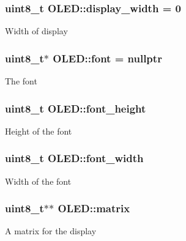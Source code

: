 \subsubsection[{\texorpdfstring{display\+\_\+width}{display_width}}]{\setlength{\rightskip}{0pt plus 5cm}uint8\+\_\+t O\+L\+E\+D\+::display\+\_\+width = 0\hspace{0.3cm}{\ttfamily [protected]}}\hypertarget{class_o_l_e_d_a2e9305cb3341509bb62d61f33cae76fd}{}\label{class_o_l_e_d_a2e9305cb3341509bb62d61f33cae76fd}
Width of display 
\subsubsection[{\texorpdfstring{font}{font}}]{\setlength{\rightskip}{0pt plus 5cm}uint8\+\_\+t$\ast$ O\+L\+E\+D\+::font = nullptr\hspace{0.3cm}{\ttfamily [protected]}}\hypertarget{class_o_l_e_d_a29ab86a4a73f4d343bf1810927f0911d}{}\label{class_o_l_e_d_a29ab86a4a73f4d343bf1810927f0911d}
The font 
\subsubsection[{\texorpdfstring{font\+\_\+height}{font_height}}]{\setlength{\rightskip}{0pt plus 5cm}uint8\+\_\+t O\+L\+E\+D\+::font\+\_\+height\hspace{0.3cm}{\ttfamily [protected]}}\hypertarget{class_o_l_e_d_a85b91421932866dea031921799ba83a3}{}\label{class_o_l_e_d_a85b91421932866dea031921799ba83a3}
Height of the font 
\subsubsection[{\texorpdfstring{font\+\_\+width}{font_width}}]{\setlength{\rightskip}{0pt plus 5cm}uint8\+\_\+t O\+L\+E\+D\+::font\+\_\+width\hspace{0.3cm}{\ttfamily [protected]}}\hypertarget{class_o_l_e_d_a3c9ea103adf6c860a2534135e9a25ba8}{}\label{class_o_l_e_d_a3c9ea103adf6c860a2534135e9a25ba8}
Width of the font 
\subsubsection[{\texorpdfstring{matrix}{matrix}}]{\setlength{\rightskip}{0pt plus 5cm}uint8\+\_\+t$\ast$$\ast$ O\+L\+E\+D\+::matrix\hspace{0.3cm}{\ttfamily [protected]}}\hypertarget{class_o_l_e_d_a9d32e21189940afba24deab0a2bc0126}{}\label{class_o_l_e_d_a9d32e21189940afba24deab0a2bc0126}
A matrix for the display 
